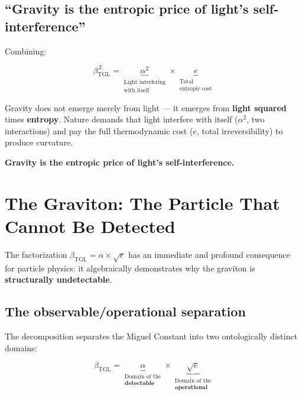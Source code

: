 \documentclass[12pt,a4paper,twoside]{article}
\newcommand{\betatgl}{\beta_{\!\scriptscriptstyle\mathrm{TGL}}}
\begin{document}
\subsection{``Gravity is the entropic price of light's self-interference''}

Combining:

\begin{conclusionbox}[title={Quadratic Synthesis}]
\begin{equation}
\betatgl^{\,2} = \underbrace{\alpha^2}_{\substack{\text{Light interfering}\\\text{with itself}}} \times \underbrace{e}_{\substack{\text{Total}\\\text{entropic cost}}}
\end{equation}

Gravity does not emerge merely from light --- it emerges from \textbf{light squared} times \textbf{entropy}. Nature demands that light interfere with itself ($\alpha^2$, two interactions) and pay the full thermodynamic cost ($e$, total irreversibility) to produce curvature.

\medskip
\textbf{Gravity is the entropic price of light's self-interference.}
\end{conclusionbox}



\section{The Graviton: The Particle That Cannot Be Detected}
\label{sec:graviton}

The factorization $\betatgl = \alpha \times \sqrt{e}$ has an immediate and profound consequence for particle physics: it algebraically demonstrates why the graviton is \textbf{structurally undetectable}.

\subsection{The observable/operational separation}

The decomposition separates the Miguel Constant into two ontologically distinct domains:

\begin{factorbox}[title={Two domains}]
\begin{equation}
\betatgl = \underbrace{\alpha}_{\substack{\text{Domain of the}\\\textbf{detectable}}} \times \underbrace{\sqrt{e}}_{\substack{\text{Domain of the}\\\textbf{operational}}}
\end{equation}
\end{factorbox}
\end{document}
